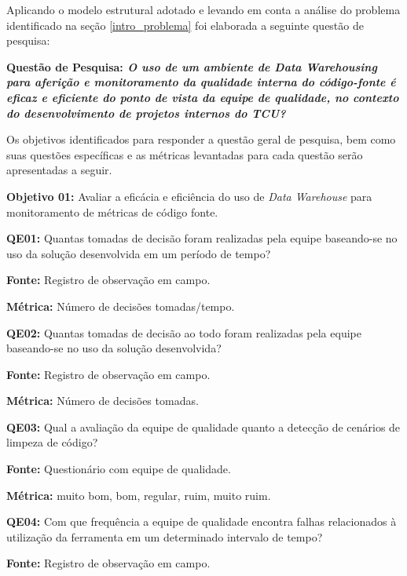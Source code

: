 Aplicando o modelo estrutural adotado e levando em conta a análise do problema identificado na seção \ref{intro_problema} foi elaborada a seguinte questão de pesquisa:

\textbf{Questão de Pesquisa: \textit{O uso de um ambiente de Data Warehousing para aferição e monitoramento da qualidade interna do código-fonte é eficaz e eficiente do ponto de vista da equipe de qualidade, no contexto do desenvolvimento de projetos internos do TCU?}}

Os objetivos identificados para responder a questão geral de pesquisa, bem como suas questões específicas e as métricas levantadas para cada questão serão apresentadas a seguir.

\textbf{Objetivo 01:} Avaliar a eficácia e eficiência do uso de \textit{Data Warehouse} para monitoramento de métricas de código fonte. \newline


\textbf{QE01:} Quantas tomadas de decisão foram realizadas pela equipe baseando-se no uso da solução desenvolvida em um período de tempo?

\textbf{Fonte:} Registro de observação em campo.

\textbf{Métrica:} Número de decisões tomadas/tempo. \newline


\textbf{QE02: } Quantas tomadas de decisão ao todo foram realizadas pela equipe baseando-se no uso da solução desenvolvida?

\textbf{Fonte:} Registro de observação em campo.

\textbf{Métrica:} Número de decisões tomadas. \newline



\textbf{QE03: } Qual a avaliação da equipe de qualidade quanto a detecção de cenários de limpeza de código?

\textbf{Fonte:} Questionário com equipe de qualidade.

\textbf{Métrica:} muito bom, bom, regular, ruim, muito ruim. \newline


\textbf{QE04: } Com que frequência a equipe de qualidade encontra falhas relacionados à utilização da ferramenta em um determinado intervalo de tempo?

\textbf{Fonte:} Registro de observação em campo.


